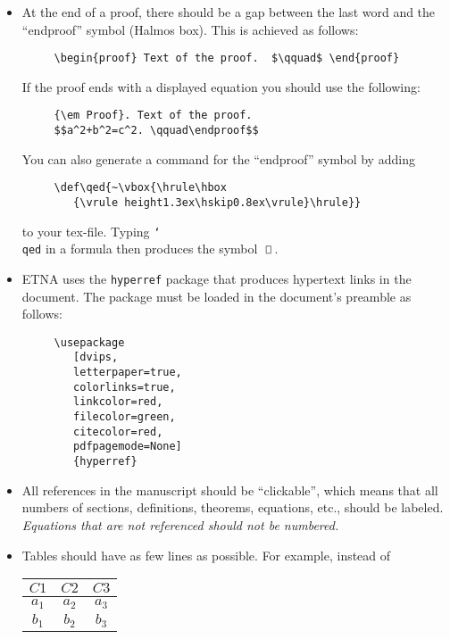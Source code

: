 \documentclass{scrartcl}
\def\qed{~\vbox{\hrule\hbox{\vrule height1.3ex\hskip0.8ex\vrule}\hrule}}
\begin{document}
\begin{itemize}
%
\item  At the end of a proof, there should be a gap between the last word and
  the ``endproof'' symbol (Halmos box). This is achieved as follows:
%
\begin{verbatim}     \begin{proof} Text of the proof.  $\qquad$ \end{proof}\end{verbatim}
%
If the proof ends with a displayed equation you should use the following:
%
\begin{verbatim}
     {\em Proof}. Text of the proof.
     $$a^2+b^2=c^2. \qquad\endproof$$
\end{verbatim}
%
You can also generate a command for the ``endproof'' symbol by adding
%
\begin{verbatim}
     \def\qed{~\vbox{\hrule\hbox
        {\vrule height1.3ex\hskip0.8ex\vrule}\hrule}}
\end{verbatim}
%
to your tex-file. Typing \texttt{\char`\\qed} in a formula then produces
the symbol $\qed\,$.
%
\item ETNA uses the \texttt{hyperref} package that produces hypertext links in
  the document. The package must be loaded in the document's preamble as
  follows:
%
\begin{verbatim}
     \usepackage
        [dvips,
        letterpaper=true,
        colorlinks=true,
        linkcolor=red,
        filecolor=green,
        citecolor=red,
        pdfpagemode=None]
        {hyperref}
\end{verbatim}

\item All references in the manuscript should be ``clickable'', which
means that all numbers of sections, definitions, theorems, equations, etc.,
should be labeled. \emph{Equations that are not referenced should not be numbered.}
%
\item Tables should have as few lines as possible. For example,
instead of\\

\hspace{2cm}\begin{tabular}{|c|c|c|}\hline
$C1$ & $C2$ & $C3$ \\ \hline
$a_1$ & $a_2$ & $a_3$ \\ \hline
$b_1$ & $b_2$ & $b_3$ \\ \hline
\end{tabular}\\


\end{itemize}
\end{document}
